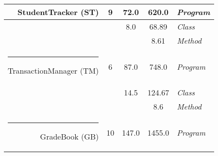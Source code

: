 \begin{center}
\begin{table}[h]
\begin{center}
\begin{tabular}{r | c | c | c | l}











{StudentTracker} ({ST})
& 9               & 72.0          & 620.0       & {\em Program}
\\ \hline

         &                 & 8.0           & 68.89       & {\em Class}
\\ \hline

         &                 &               & 8.61        & {\em Method} 
\\ [.01in] \hline \hline 

\rule{-.1in}{20pt}

{TransactionManager} ({TM})
& 6               & 87.0          & 748.0       & {\em Program}
\\ \hline

         &                 & 14.5          & 124.67      & {\em Class}
\\ \hline

         &                 &               & 8.6         & {\em Method} 
\\ [.01in] \hline \hline 

\rule{-.1in}{20pt}

{GradeBook} ({GB})
& 10              & 147.0         & 1455.0       & {\em Program}
\\ \hline


\end{tabular}
\end{center}
\end{table}
\end{center}
